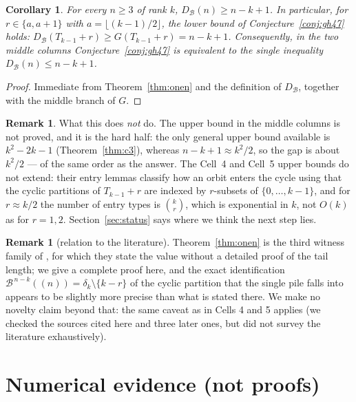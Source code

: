 \documentclass[11pt]{article}
\newtheorem{corollary}[theorem]{Corollary}
\theoremstyle{definition}
\newtheorem{remark}[theorem]{Remark}
\newcommand{\B}{\mathcal{B}}
\newcommand{\DB}{D_{\mathcal{B}}}
\renewcommand{\le}{\leqslant}
\renewcommand{\ge}{\geqslant}
\begin{document}
\begin{corollary}\label{cor:middle}
For every $n\ge3$ of rank $k$, $\DB(n)\ge n-k+1$.  In particular, for $r\in\{a,a+1\}$ with
$a=\lfloor(k-1)/2\rfloor$, the \emph{lower} bound of Conjecture~\ref{conj:gh47} holds:
$\DB(T_{k-1}+r)\ge G(T_{k-1}+r)=n-k+1$.  Consequently, in the two middle columns Conjecture~\ref{conj:gh47} is
equivalent to the single inequality $\DB(n)\le n-k+1$.
\end{corollary}

\begin{proof}
Immediate from Theorem~\ref{thm:onen} and the definition of $\DB$, together with the middle branch of $G$.
\end{proof}

\begin{remark}
What this does \emph{not} do.  The upper bound in the middle columns is not proved, and it is the hard half: the
only general upper bound available is $k^2-2k-1$ (Theorem~\ref{thm:c3}), whereas $n-k+1\approx k^2/2$, so the gap
is about $k^2/2$ --- of the same order as the answer.  The Cell~4 and Cell~5 upper bounds do not extend: their
entry lemmas classify how an orbit enters the cycle using that the cyclic partitions of $T_{k-1}+r$ are indexed by
$r$-subsets of $\{0,\dots,k-1\}$, and for $r\approx k/2$ the number of entry types is $\binom{k}{r}$, which is
exponential in $k$, not $O(k)$ as for $r=1,2$.  Section~\ref{sec:status} says where we think the next step lies.
\end{remark}

\begin{remark}[relation to the literature]
Theorem~\ref{thm:onen} is the third witness family of \cite[Thm.~4.5]{GH98}, for which they state the value without
a detailed proof of the tail length; we give a complete proof here, and the exact identification
$\B^{\,n-k}((n))=\delta_k\setminus\{k-r\}$ of the cyclic partition that the single pile falls into appears to be
slightly more precise than what is stated there.  We make no novelty claim beyond that: the same caveat as in
Cells 4 and 5 applies (we checked the sources cited here and three later ones, but did not survey the literature
exhaustively).
\end{remark}

\section{Numerical evidence (not proofs)}\label{sec:numerics}
\end{document}

